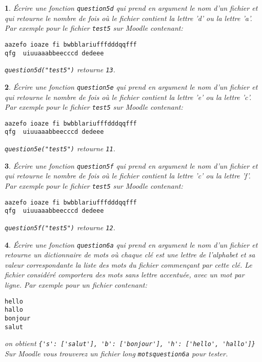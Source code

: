 \documentclass[10pt]{article}
\newtheorem{exi}{}
\newenvironment{exo}{\begin{exi}\em}{\end{exi}}
\begin{document}
\vspace*{-2ex}
\begin{exo}
    Écrire une fonction {\tt question5d} qui prend en argument le nom d'un fichier et qui retourne le nombre de fois où le fichier contient la lettre 'd' ou la
lettre 'a'.
Par exemple pour le fichier \verb+test5+ sur Moodle contenant: 
\begin{verbatim} 
aazefo ioaze fi bwbblariufffdddqqfff
qfg  uiuuaaabbeecccd dedeee
\end{verbatim} 
\verb+question5d("test5")+ retourne \verb+13+.
\end{exo}
\vspace*{-2ex}
\begin{exo}
    Écrire une fonction {\tt question5e} qui prend en argument le nom d'un fichier et qui retourne le nombre de fois où le fichier contient la lettre 'e' ou la
lettre 'c'.
Par exemple pour le fichier \verb+test5+ sur Moodle contenant: 
\begin{verbatim} 
aazefo ioaze fi bwbblariufffdddqqfff
qfg  uiuuaaabbeecccd dedeee
\end{verbatim} 
\verb+question5e("test5")+ retourne \verb+11+.
\end{exo}
\vspace*{-2ex}
\begin{exo}
    Écrire une fonction {\tt question5f} qui prend en argument le nom d'un fichier et qui retourne le nombre de fois où le fichier contient la lettre 'c' ou la
lettre 'f'.
Par exemple pour le fichier \verb+test5+ sur Moodle contenant: 
\begin{verbatim} 
aazefo ioaze fi bwbblariufffdddqqfff
qfg  uiuuaaabbeecccd dedeee
\end{verbatim} 
\verb+question5f("test5")+ retourne \verb+12+.
\end{exo}
\vspace*{-2ex}
\begin{exo}
    Écrire une fonction \verb+question6a+ qui prend en argument le nom d'un fichier
et retourne un dictionnaire de mots où chaque clé est une lettre de
l'alphabet et sa valeur correspondante la liste des mots du fichier commençant
par cette clé. Le fichier considéré comportera des mots 
sans lettre accentuée, avec un mot par ligne. Par exemple pour un fichier
contenant:
\begin{verbatim}
hello
hallo
bonjour
salut
\end{verbatim}
on obtient \verb+{'s': ['salut'], 'b': ['bonjour'], 'h': ['hello', 'hallo']}+\\
Sur Moodle vous trouverez un fichier long \verb+motsquestion6a+ pour tester.
\end{exo}
\end{document}
